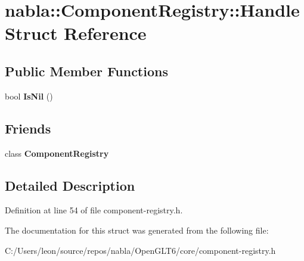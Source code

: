 \hypertarget{structnabla_1_1_component_registry_1_1_handle}{}\section{nabla\+::Component\+Registry\+::Handle Struct Reference}
\label{structnabla_1_1_component_registry_1_1_handle}
\subsection*{Public Member Functions}
\begin{DoxyCompactItemize}
\item 
\mbox{\label{structnabla_1_1_component_registry_1_1_handle_a71538cc515d2bd851b8e599a6908cd0b}} 
bool {\bfseries Is\+Nil} ()
\end{DoxyCompactItemize}
\subsection*{Friends}
\begin{DoxyCompactItemize}
\item 
\mbox{\label{structnabla_1_1_component_registry_1_1_handle_a1da30f92d011625cd9eed0403ad64dbf}} 
class {\bfseries Component\+Registry}
\end{DoxyCompactItemize}


\subsection{Detailed Description}


Definition at line 54 of file component-\/registry.\+h.



The documentation for this struct was generated from the following file\+:\begin{DoxyCompactItemize}
\item 
C\+:/\+Users/leon/source/repos/nabla/\+Open\+G\+L\+T6/core/component-\/registry.\+h\end{DoxyCompactItemize}
